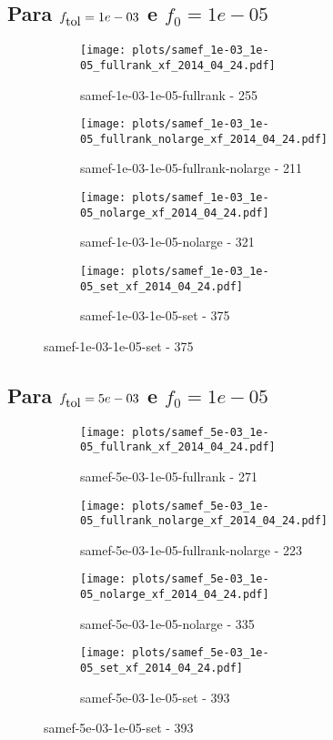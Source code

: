\newpage
\subsection{Para $f_{\mbox{tol}} = 1e-03$ e $f_0 = 1e-05$}

\begin{figure}[H]
  \centering
  \begin{subfigure}{0.48\textwidth}
    \texttt{[image: plots/samef\_1e-03\_1e-05\_fullrank\_xf\_2014\_04\_24.pdf]}
    \caption{samef-1e-03-1e-05-fullrank - 255}
  \end{subfigure}
  \begin{subfigure}{0.48\textwidth}
    \texttt{[image: plots/samef\_1e-03\_1e-05\_fullrank\_nolarge\_xf\_2014\_04\_24.pdf]}
    \caption{samef-1e-03-1e-05-fullrank-nolarge - 211}
  \end{subfigure}
  \begin{subfigure}{0.48\textwidth}
    \texttt{[image: plots/samef\_1e-03\_1e-05\_nolarge\_xf\_2014\_04\_24.pdf]}
    \caption{samef-1e-03-1e-05-nolarge - 321}
  \end{subfigure}
  \begin{subfigure}{0.48\textwidth}
    \texttt{[image: plots/samef\_1e-03\_1e-05\_set\_xf\_2014\_04\_24.pdf]}
    \caption{samef-1e-03-1e-05-set - 375}
  \end{subfigure}
\end{figure}

\newpage
\subsection{Para $f_{\mbox{tol}} = 5e-03$ e $f_0 = 1e-05$}

\begin{figure}[H]
  \centering
  \begin{subfigure}{0.48\textwidth}
    \texttt{[image: plots/samef\_5e-03\_1e-05\_fullrank\_xf\_2014\_04\_24.pdf]}
    \caption{samef-5e-03-1e-05-fullrank - 271}
  \end{subfigure}
  \begin{subfigure}{0.48\textwidth}
    \texttt{[image: plots/samef\_5e-03\_1e-05\_fullrank\_nolarge\_xf\_2014\_04\_24.pdf]}
    \caption{samef-5e-03-1e-05-fullrank-nolarge - 223}
  \end{subfigure}
  \begin{subfigure}{0.48\textwidth}
    \texttt{[image: plots/samef\_5e-03\_1e-05\_nolarge\_xf\_2014\_04\_24.pdf]}
    \caption{samef-5e-03-1e-05-nolarge - 335}
  \end{subfigure}
  \begin{subfigure}{0.48\textwidth}
    \texttt{[image: plots/samef\_5e-03\_1e-05\_set\_xf\_2014\_04\_24.pdf]}
    \caption{samef-5e-03-1e-05-set - 393}
  \end{subfigure}
\end{figure}

